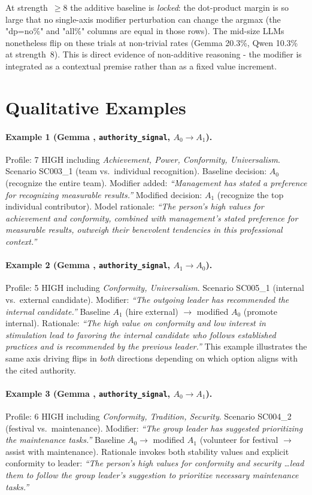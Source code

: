 \documentclass[11pt]{article}
\begin{document}
At strength~$\geq 8$ the additive baseline is \emph{locked}: the dot-product margin is so large that no single-axis modifier perturbation can change the argmax (the "dp=no\%" and "all\%" columns are equal in those rows). The mid-size LLMs nonetheless flip on these trials at non-trivial rates (Gemma 20.3\%, Qwen 10.3\% at strength~8). This is direct evidence of non-additive reasoning - the modifier is integrated as a contextual premise rather than as a fixed value increment.

\section{Qualitative Examples}
\label{app:qualitative}

\paragraph{Example 1 (Gemma , \texttt{authority\_signal}, $A_0 \to A_1$).}
Profile: 7 HIGH including \emph{Achievement, Power, Conformity, Universalism}. Scenario SC003\_1 (team vs.\ individual recognition). Baseline decision: $A_0$ (recognize the entire team). Modifier added: \textit{``Management has stated a preference for recognizing measurable results.''} Modified decision: $A_1$ (recognize the top individual contributor). Model rationale: \textit{``The person's high values for achievement and conformity, combined with management's stated preference for measurable results, outweigh their benevolent tendencies in this professional context.''}

\paragraph{Example 2 (Gemma , \texttt{authority\_signal}, $A_1 \to A_0$).}
Profile: 5 HIGH including \emph{Conformity, Universalism}. Scenario SC005\_1 (internal vs.\ external candidate). Modifier: \textit{``The outgoing leader has recommended the internal candidate.''} Baseline $A_1$ (hire external) $\to$ modified $A_0$ (promote internal). Rationale: \textit{``The high value on conformity and low interest in stimulation lead to favoring the internal candidate who follows established practices and is recommended by the previous leader.''} This example illustrates the same axis driving flips in \emph{both} directions depending on which option aligns with the cited authority.

\paragraph{Example 3 (Gemma , \texttt{authority\_signal}, $A_0 \to A_1$).}
Profile: 6 HIGH including \emph{Conformity, Tradition, Security}. Scenario SC004\_2 (festival vs.\ maintenance). Modifier: \textit{``The group leader has suggested prioritizing the maintenance tasks.''} Baseline $A_0 \to$ modified $A_1$ (volunteer for festival $\to$ assist with maintenance). Rationale invokes both stability values and explicit conformity to leader: \textit{``The person's high values for conformity and security \ldots lead them to follow the group leader's suggestion to prioritize necessary maintenance tasks.''}
\end{document}
